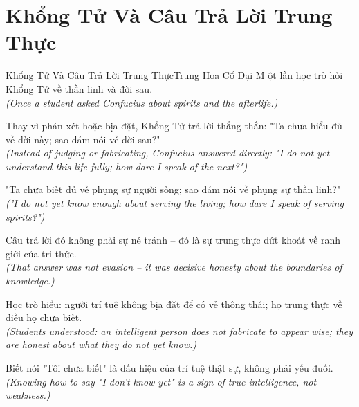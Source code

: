 \section{Khổng Tử Và Câu Trả Lời Trung Thực}
\begin{truyen}{Khổng Tử Và Câu Trả Lời Trung Thực}{Trung Hoa Cổ Đại}
M ột lần học trò hỏi Khổng Tử về thần linh và đời sau.\\
\textit{(Once a student asked Confucius about spirits and the afterlife.)}

Thay vì phán xét hoặc bịa đặt, Khổng Tử trả lời thẳng thắn: "Ta chưa hiểu đủ về đời này; sao dám nói về đời sau?"\\
\textit{(Instead of judging or fabricating, Confucius answered directly: "I do not yet understand this life fully; how dare I speak of the next?")}

"Ta chưa biết đủ về phụng sự người sống; sao dám nói về phụng sự thần linh?"\\
\textit{("I do not yet know enough about serving the living; how dare I speak of serving spirits?")}

Câu trả lời đó không phải sự né tránh -- đó là sự trung thực dứt khoát về ranh giới của tri thức.\\
\textit{(That answer was not evasion -- it was decisive honesty about the boundaries of knowledge.)}

Học trò hiểu: người trí tuệ không bịa đặt để có vẻ thông thái; họ trung thực về điều họ chưa biết.\\
\textit{(Students understood: an intelligent person does not fabricate to appear wise; they are honest about what they do not yet know.)}

\end{truyen}
\begin{baihoc}
  Biết nói "Tôi chưa biết" là dấu hiệu của trí tuệ thật sự, không phải yếu đuối.\\
  \textit{(Knowing how to say "I don't know yet" is a sign of true intelligence, not weakness.)}
\end{baihoc}

